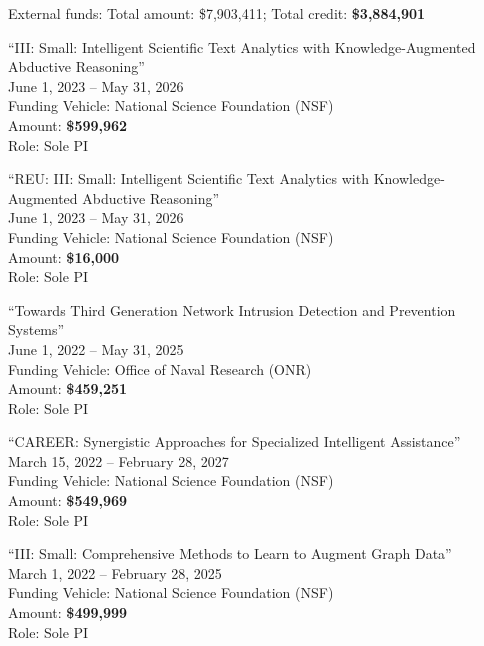 \documentclass[10pt]{article}
\newenvironment{myindentpar}[1]%
{\begin{list}{}%
         {\setlength{\leftmargin}{#1}}%
         \item[]%
}
{\end{list}}
\newcounter{list}
\begin{document}
\begin{myindentpar}{0.75cm}

\hspace{-0.75cm}External funds: Total amount: \$7,903,411; Total credit: \textbf{\$3,884,901}

\hspace{-0.75cm}``III: Small: Intelligent Scientific Text Analytics with Knowledge-Augmented Abductive Reasoning'' \\
June 1, 2023 -- May 31, 2026 \\
Funding Vehicle: National Science Foundation (NSF) \\
Amount: \textbf{\$599,962} \\
Role: {Sole PI}

\hspace{-0.75cm}``REU: III: Small: Intelligent Scientific Text Analytics with Knowledge-Augmented Abductive Reasoning'' \\
June 1, 2023 -- May 31, 2026 \\
Funding Vehicle: National Science Foundation (NSF) \\
Amount: \textbf{\$16,000} \\
Role: {Sole PI}

\hspace{-0.75cm}``Towards Third Generation Network Intrusion Detection and Prevention Systems'' \\
June 1, 2022 -- May 31, 2025 \\
Funding Vehicle: Office of Naval Research (ONR) \\
Amount: \textbf{\$459,251} \\
Role: {Sole PI}

\hspace{-0.75cm}``CAREER: Synergistic Approaches for Specialized Intelligent Assistance'' \\
March 15, 2022 -- February 28, 2027 \\
Funding Vehicle: National Science Foundation (NSF) \\
Amount: \textbf{\$549,969} \\
Role: {Sole PI}

\hspace{-0.75cm}``III: Small: Comprehensive Methods to Learn to Augment Graph Data'' \\
March 1, 2022 -- February 28, 2025 \\
Funding Vehicle: National Science Foundation (NSF) \\
Amount: \textbf{\$499,999} \\
Role: {Sole PI}


\end{myindentpar}
\end{document}
